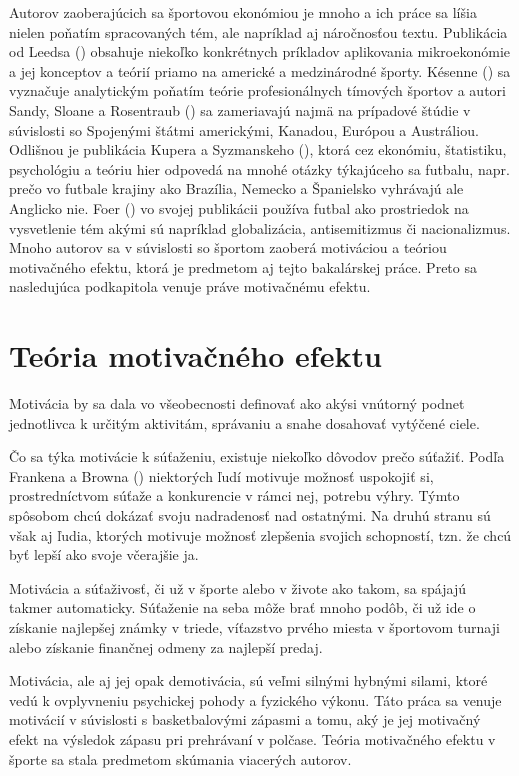 \documentclass[
  digital, %
  twoside, %
  notable,   %
  lof,     %
  lot,     %
]{fithesis3}
\begin{document}
	Autorov zaoberajúcich sa športovou ekonómiou je mnoho a ich práce sa líšia nielen poňatím spracovaných tém, ale napríklad aj náročnosťou textu. Publikácia od Leedsa (\citeyear{leeds2018}) obsahuje niekoľko konkrétnych príkladov aplikovania mikroekonómie a jej konceptov a teórií priamo na americké a medzinárodné športy. Késenne (\citeyear{kesenne2014}) sa vyznačuje analytickým poňatím teórie profesionálnych tímových športov a autori Sandy, Sloane a Rosentraub (\citeyear{sandy2004}) sa zameriavajú najmä na prípadové štúdie v súvislosti so Spojenými štátmi americkými, Kanadou, Európou a Austráliou. Odlišnou je publikácia Kupera a Syzmanskeho (\citeyear{kuper2009}), ktorá cez ekonómiu, štatistiku, psychológiu a teóriu hier odpovedá na mnohé otázky týkajúceho sa futbalu, napr. prečo vo futbale krajiny ako Brazília, Nemecko a Španielsko vyhrávajú ale Anglicko nie. Foer (\citeyear{foer2004}) vo svojej publikácii používa futbal ako prostriedok na vysvetlenie tém akými sú napríklad globalizácia, antisemitizmus či nacionalizmus. Mnoho autorov sa v súvislosti so športom zaoberá motiváciou a teóriou motivačného efektu, ktorá je predmetom aj tejto bakalárskej práce. Preto sa nasledujúca podkapitola venuje práve motivačnému efektu.
	
		\section{Teória motivačného efektu}
		Motivácia by sa dala vo všeobecnosti definovať ako akýsi vnútorný podnet jednotlivca k určitým aktivitám, správaniu a snahe dosahovať vytýčené ciele. 
		
		Čo sa týka motivácie k súťaženiu, existuje niekoľko dôvodov prečo súťažiť. Podľa Frankena a Browna (\citeyear[s.~176]{franken1995}) niektorých ľudí motivuje možnosť uspokojiť si, prostredníctvom súťaže a konkurencie v rámci nej, potrebu výhry. Týmto spôsobom chcú dokázať svoju nadradenosť nad ostatnými. \parencite{nicholls1989} Na druhú stranu sú však aj ľudia, ktorých motivuje možnosť zlepšenia svojich schopností, tzn. že chcú byť lepší ako svoje včerajšie ja.
		
		Motivácia a súťaživosť, či už v športe alebo v živote ako takom, sa spájajú takmer automaticky. Súťaženie na seba môže brať mnoho podôb, či už ide o získanie najlepšej známky v triede, víťazstvo prvého miesta v športovom turnaji alebo získanie finančnej odmeny za najlepší predaj. \parencite[s.~210]{tauer1999}
		
		Motivácia, ale aj jej opak demotivácia, sú veľmi silnými hybnými silami, ktoré vedú k ovplyvneniu psychickej pohody a fyzického výkonu. Táto práca sa venuje motivácií v súvislosti s basketbalovými zápasmi a tomu, aký je jej motivačný efekt na výsledok zápasu pri prehrávaní v polčase. Teória motivačného efektu v športe sa stala predmetom skúmania viacerých autorov. 
		
\end{document}
